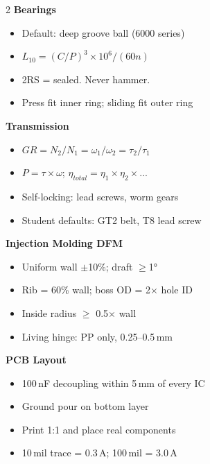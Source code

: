 \begin{multicols}{2}
\textbf{Bearings}
\begin{itemize}[nosep,leftmargin=1em]
\item Default: deep groove ball (6000 series)
\item $L_{10} = (C/P)^3 \times 10^6/(60n)$
\item 2RS = sealed. Never hammer.
\item Press fit inner ring; sliding fit outer ring
\end{itemize}

\textbf{Transmission}
\begin{itemize}[nosep,leftmargin=1em]
\item $GR = N_2/N_1 = \omega_1/\omega_2 = \tau_2/\tau_1$
\item $P = \tau \times \omega$; $\eta_{total} = \eta_1 \times \eta_2 \times ...$
\item Self-locking: lead screws, worm gears
\item Student defaults: GT2 belt, T8 lead screw
\end{itemize}

\textbf{Injection Molding DFM}
\begin{itemize}[nosep,leftmargin=1em]
\item Uniform wall $\pm$10\%; draft $\geq$\ang{1}
\item Rib = 60\% wall; boss OD = 2$\times$ hole ID
\item Inside radius $\geq$ 0.5$\times$ wall
\item Living hinge: PP only, 0.25--0.5\,mm
\end{itemize}

\textbf{PCB Layout}
\begin{itemize}[nosep,leftmargin=1em]
\item 100\,nF decoupling within 5\,mm of every IC
\item Ground pour on bottom layer
\item Print 1:1 and place real components
\item 10\,mil trace = 0.3\,A; 100\,mil = 3.0\,A
\end{itemize}
\end{multicols}


